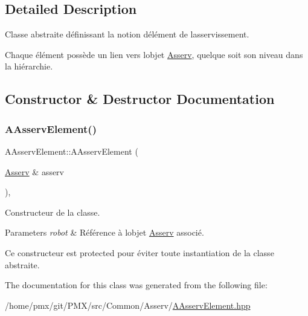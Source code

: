 \subsection{Detailed Description}
Classe abstraite définissant la notion d\textquotesingle{}élément de l\textquotesingle{}asservissement. 

Chaque élément possède un lien vers l\textquotesingle{}objet \hyperlink{classAsserv}{Asserv}, quelque soit son niveau dans la hiérarchie. 

\subsection{Constructor \& Destructor Documentation}
\mbox{\label{classAAsservElement_af0b6767d631173c912e7e16e6f1c6db1}} 
\subsubsection{\texorpdfstring{A\+Asserv\+Element()}{AAsservElement()}}
{\footnotesize\ttfamily A\+Asserv\+Element\+::\+A\+Asserv\+Element (\begin{DoxyParamCaption}\item[{\hyperlink{classAsserv}{Asserv} \&}]{asserv }\end{DoxyParamCaption})\hspace{0.3cm}{\ttfamily [inline]}, {\ttfamily [protected]}}



Constructeur de la classe. 


\begin{DoxyParams}{Parameters}
{\em robot} & Référence à l\textquotesingle{}objet \hyperlink{classAsserv}{Asserv} associé.\\
\hline
\end{DoxyParams}
Ce constructeur est {\ttfamily protected} pour éviter toute instantiation de la classe abstraite. 

The documentation for this class was generated from the following file\+:\begin{DoxyCompactItemize}
\item 
/home/pmx/git/\+P\+M\+X/src/\+Common/\+Asserv/\hyperlink{AAsservElement_8hpp}{A\+Asserv\+Element.\+hpp}\end{DoxyCompactItemize}
